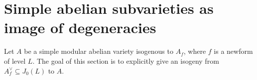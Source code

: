 

\section{Simple abelian subvarieties as image of degeneracies}

Let $A$ be a simple modular abelian variety isogenous to $A_f$, where $f$ is a
newform of level $L$. The goal of this section is to explicitly give an isogeny
from $A_f ^\vee\subseteq J_0(L)$ to $A$. 

